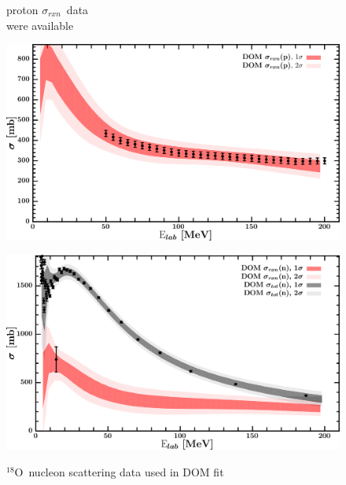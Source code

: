 \documentclass[twocolumn,secnumarabic,amssymb, nobibnotes, aps, prl,
superscriptaddress, nobalancelastpage, draft]{revtex4}
\newcommand{\rxn}{\ensuremath{\sigma_{rxn}}}
\newcommand{\oEight}{\ensuremath{^{18}}O}
\begin{document}
\begin{figure}[!htb]
\begin{minipage}{0.4\linewidth}
\begin{minipage}[c]{0.4\linewidth}
            proton \rxn\ data\\
            were available
        \end{minipage}
        \label{DOM_o18_neutron_elastic}
    \end{minipage}
    \centering
    \begin{minipage}{0.4\linewidth}
        \centering
        \includegraphics[width=\linewidth]{figures/o18_protonInelastic.png}
        \label{DOM_o18_proton_inelastic}
    \end{minipage}\hspace{6pt}
    \begin{minipage}{0.4\linewidth}
        \centering
        \includegraphics[width=\linewidth]{figures/o18_neutronInelastic.png}
        \label{DOM_o18_neutron_inelastic}
    \end{minipage}
    \caption{\oEight\ nucleon scattering data used in DOM fit}
    \label{DOM_o18_scattering}
    \centering
    \begin{minipage}{0.4\linewidth}
        \centering

\end{minipage}
\end{figure}
\end{document}
